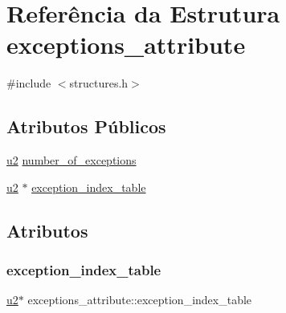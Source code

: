 \hypertarget{structexceptions__attribute}{}\section{Referência da Estrutura exceptions\+\_\+attribute}
\label{structexceptions__attribute}


{\ttfamily \#include $<$structures.\+h$>$}

\subsection*{Atributos Públicos}
\begin{DoxyCompactItemize}
\item 
\hyperlink{lista__operandos_8h_a732cde1300aafb73b0ea6c2558a7a54f}{u2} \hyperlink{structexceptions__attribute_acc85fb50930b682cc98d89e2128a065a}{number\+\_\+of\+\_\+exceptions}
\item 
\hyperlink{lista__operandos_8h_a732cde1300aafb73b0ea6c2558a7a54f}{u2} $\ast$ \hyperlink{structexceptions__attribute_ae7a712d07214e739d25465f9806c514f}{exception\+\_\+index\+\_\+table}
\end{DoxyCompactItemize}


\subsection{Atributos}
\mbox{\label{structexceptions__attribute_ae7a712d07214e739d25465f9806c514f}} 
\subsubsection{\texorpdfstring{exception\+\_\+index\+\_\+table}{exception\_index\_table}}
{\footnotesize\ttfamily \hyperlink{lista__operandos_8h_a732cde1300aafb73b0ea6c2558a7a54f}{u2}$\ast$ exceptions\+\_\+attribute\+::exception\+\_\+index\+\_\+table}

\mbox{\label{structexceptions__attribute_acc85fb50930b682cc98d89e2128a065a}} 
